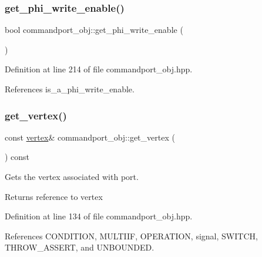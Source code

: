 \subsubsection{\texorpdfstring{get\+\_\+phi\+\_\+write\+\_\+enable()}{get\_phi\_write\_enable()}}
{\footnotesize\ttfamily bool commandport\+\_\+obj\+::get\+\_\+phi\+\_\+write\+\_\+enable (\begin{DoxyParamCaption}{ }\end{DoxyParamCaption})\hspace{0.3cm}{\ttfamily [inline]}}



Definition at line 214 of file commandport\+\_\+obj.\+hpp.



References is\+\_\+a\+\_\+phi\+\_\+write\+\_\+enable.

\mbox{\label{classcommandport__obj_a4bc4437635b608689e863e7db4668ac9}} 
\subsubsection{\texorpdfstring{get\+\_\+vertex()}{get\_vertex()}}
{\footnotesize\ttfamily const \hyperlink{graph_8hpp_abefdcf0544e601805af44eca032cca14}{vertex}\& commandport\+\_\+obj\+::get\+\_\+vertex (\begin{DoxyParamCaption}{ }\end{DoxyParamCaption}) const\hspace{0.3cm}{\ttfamily [inline]}}



Gets the vertex associated with port. 

\begin{DoxyReturn}{Returns}
reference to vertex 
\end{DoxyReturn}


Definition at line 134 of file commandport\+\_\+obj.\+hpp.



References C\+O\+N\+D\+I\+T\+I\+ON, M\+U\+L\+T\+I\+IF, O\+P\+E\+R\+A\+T\+I\+ON, signal, S\+W\+I\+T\+CH, T\+H\+R\+O\+W\+\_\+\+A\+S\+S\+E\+RT, and U\+N\+B\+O\+U\+N\+D\+ED.

\mbox{\label{classcommandport__obj_a3f2c860a8418fe49dc6e866d5f14e7d7}} 
